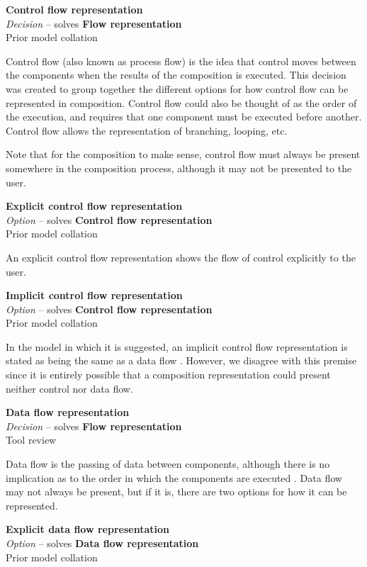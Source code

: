 \textbf{Control flow representation} \\ \emph{Decision} -- solves \textbf{Flow representation} \\ Prior model collation

Control flow (also known as process flow) is the idea that control moves between the components when the results of the composition is executed. This decision was created to group together the different options for how control flow can be represented in composition. Control flow could also be thought of as the order of the execution, and requires that one component must be executed before another. Control flow allows the representation of branching, looping, etc.

Note that for the composition to make sense, control flow must always be present somewhere in the composition process, although it may not be presented to the user.

\textbf{Explicit control flow representation} \\ \emph{Option} -- solves \textbf{Control flow representation} \\ Prior model collation \cite{Grammel2010,Aghaee2012}

An explicit control flow representation shows the flow of control explicitly to the user.

\textbf{Implicit control flow representation} \\ \emph{Option} -- solves \textbf{Control flow representation} \\ Prior model collation \cite{Aghaee2012}

In the model in which it is suggested, an implicit control flow representation is stated as being the same as a data flow \cite{Aghaee2012}. However, we disagree with this premise since it is entirely possible that a composition representation could present neither control nor data flow.

\textbf{Data flow representation} \\ \emph{Decision} -- solves \textbf{Flow representation} \\ Tool review

Data flow is the passing of data between components, although there is no implication as to the order in which the components are executed \cite{Wajid2010}. Data flow may not always be present, but if it is, there are two options for how it can be represented.

\textbf{Explicit data flow representation} \\ \emph{Option} -- solves \textbf{Data flow representation} \\ Prior model collation \cite{Grammel2010}

